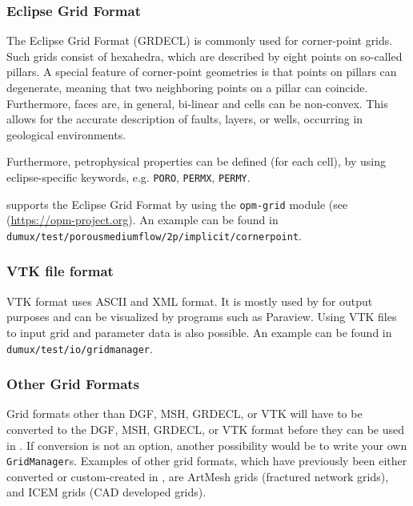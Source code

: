 \subsubsection{Eclipse Grid Format}
The Eclipse Grid Format (GRDECL) is commonly used for corner-point grids.
Such grids consist of hexahedra, which are described by eight points on so-called pillars. A special feature of corner-point geometries is that points on pillars can degenerate, meaning that two neighboring points on a pillar can coincide. Furthermore, faces are, in general, bi-linear and cells can be non-convex. This allows for the accurate description of faults, layers, or wells, occurring in geological environments.

Furthermore, petrophysical properties can be defined (for each cell), by using eclipse-specific keywords, e.g. \texttt{PORO}, \texttt{PERMX}, \texttt{PERMY}.

\Dumux supports the Eclipse Grid Format by using the \texttt{opm-grid} module (see (\url{https://opm-project.org}).
An example can be found in \texttt{dumux/test\allowbreak/porousmediumflow/2p/implicit/cornerpoint}.

\subsubsection{VTK file format}
VTK format uses ASCII and XML format. It is mostly used by \Dumux for output purposes and can be visualized by programs such as Paraview. Using VTK files to input grid and parameter data is also possible.
An example can be found in \texttt{dumux/test\allowbreak/io/gridmanager}.

\subsubsection{Other Grid Formats}
Grid formats other than DGF, MSH, GRDECL, or VTK will have to be converted to the DGF, MSH, GRDECL, or VTK format before they can be used in \Dumux.
If conversion is not an option, another possibility would be to write your own \texttt{GridManager}s. Examples of other grid formats,
which have previously been either converted or custom-created in \Dumux, are ArtMesh grids (fractured network grids), and ICEM grids (CAD developed grids).

